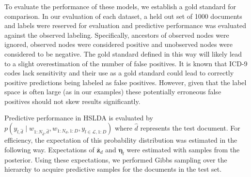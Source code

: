 To evaluate the performance of these models, we establish a gold standard for comparison.
In our evaluation of each dataset, a held out set of 1000 documents and labels were
reserved for evaluation and predictive performance was evaluated against the observed
labeling. Specifically, ancestors of observed nodes were ignored, observed nodes 
were considered positive and unobserved nodes were considered to be negative. The gold
standard defined in this way will likely lead to a slight overestimation of the number of
false positives. It is known that ICD-9 codes lack sensitivity and their use as a
gold standard could lead to correctly positive predictions being labeled as false positives.
However, given that the label space is often large (as in our examples) these potentially
erroneous false positives should not skew results significantly.

Predictive performance in HSLDA is evaluated by $p\left(y_{l,\hat{d}}\mid w_{1:N_{\hat{d}},\hat{d}}, w_{1:N_d,1:D},  y_{l\in\mathcal{L},1:D}\right)$ where $\hat{d}$ represents the test document. For efficiency,
the expectation of this probability distribution was estimated in the following way. Expectations
of $\mathbf{\bar{z}}_d$ and $\boldsymbol{\eta}_l$ were estimated with samples from the posterior.
Using these expectations, we performed Gibbs sampling over the hierarchy to acquire predictive
samples for the documents in the test set.


